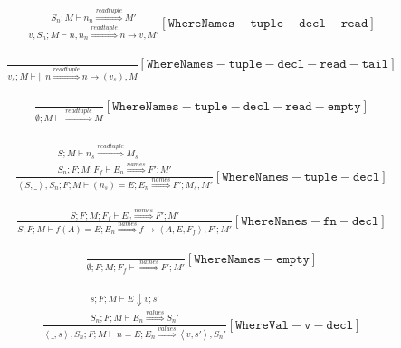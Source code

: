 \documentclass{scrartcl}
\begin{document}
    \begin{align*}
    \frac{
        S_n; M \vdash n_n \overset{readtuple}{\Rightarrow} M'
    }{
        v, S_n; M \vdash n, n_n \overset{readtuple}{\Rightarrow} n \to v, M'
    }[\mathtt{WhereNames-tuple-decl-read}]
    \end{align*}
    
    \begin{align*}
    \frac{}{
        v_s; M \vdash | \enspace n \overset{readtuple}{\Rightarrow} n \to (v_s), M
    }[\mathtt{WhereNames-tuple-decl-read-tail}]
    \end{align*}
    
    \begin{align*}
    \frac{}{
        \emptyset; M \vdash \overset{readtuple}{\Rightarrow} M
    }[\mathtt{WhereNames-tuple-decl-read-empty}]
    \end{align*}
    
    \begin{align*}
    \frac{
        \begin{matrix}
        S; M \vdash n_s \overset{readtuple}{\Rightarrow} M_s \\
        S_n; F; M; F_f \vdash E_n \overset{names}{\Rightarrow} F'; M'
        \end{matrix}
    }{
        \left<S, \_ \right>, S_n; F; M \vdash (n_s) = E; E_n \overset{names}{\Rightarrow} F'; M_s, M'
    }[\mathtt{WhereNames-tuple-decl}]
    \end{align*}
    
    \begin{align*}
    \frac{
        S; F; M; F_f \vdash E_v \overset{names}{\Rightarrow} F'; M'
    }{
        S; F; M \vdash f(A) = E; E_n \overset{names}{\Rightarrow} f \to \left< A, E, F_f \right >, F'; M'
    }[\mathtt{WhereNames-fn-decl}]
    \end{align*}
    
    \begin{align*}
    \frac{}{
        \emptyset; F; M; F_f \vdash \overset{names}{\Rightarrow} F'; M'
    }[\mathtt{WhereNames-empty}]
    \end{align*}
    
    \begin{align*}
    \frac{
        \begin{matrix}
        s; F; M \vdash E \Downarrow v; s' \\
        S_n; F; M \vdash E_n \overset{values}{\Rightarrow} S_n'
        \end{matrix}
    }{
        \left<\_, s\right>, S_n; F; M \vdash n = E; E_n \overset{values}{\Rightarrow} \left<v, s'\right>, S_n'
    }[\mathtt{WhereVal-v-decl}]
    \end{align*}
    
\end{document}

